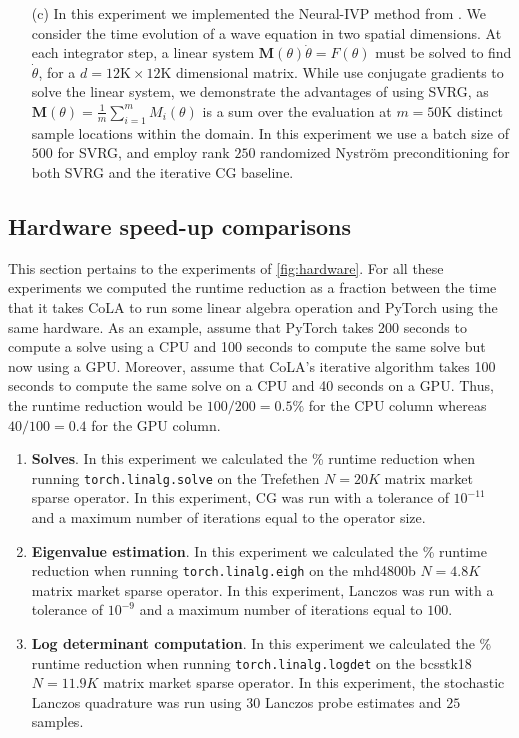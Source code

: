 \documentclass{article}
\newcommand{\mbf}[1]{{\boldsymbol{\mathbf{#1}}}}
\renewcommand{\bm}{\mbf}
\begin{document}
\begin{enumerate}
    \item[(c)]
    In this experiment we implemented the Neural-IVP method from \citet{finzi2023nivp}.
    We consider the time evolution of a wave equation in two spatial dimensions.
    At each integrator step, a linear system $\bm M(\theta) \dot{\theta} = F(\theta)$ must be solved to find $\dot{\theta}$, for a $d=12\text{K}\times12$K dimensional matrix.
    While \citet{finzi2023nivp} use conjugate gradients to solve the linear system,
    we demonstrate the advantages of using SVRG,
    as $\bm M(\theta) = \tfrac{1}{m}\sum_{i=1}^m M_i(\theta)$ is a sum over the evaluation at $m=50$K distinct sample locations within the domain.
    In this experiment we use a batch size of $500$ for SVRG, and employ rank $250$ randomized Nystr\"{o}m preconditioning for both SVRG and the iterative CG baseline.
\end{enumerate}

\subsection{Hardware speed-up comparisons} \label{app:hardware}
This section pertains to the experiments of \autoref{fig:hardware}.
For all these experiments we computed the runtime reduction
as a fraction between the time that it takes CoLA
to run some linear algebra operation and PyTorch using the same hardware.
As an example, assume that PyTorch takes 200 seconds to compute a solve using a CPU and 100 seconds to compute the same solve but now using a GPU.
Moreover, assume that CoLA's iterative algorithm takes 100 seconds to compute the same solve on a CPU and 40 seconds on a GPU.
Thus, the runtime reduction would be $100 / 200 = 0.5\%$ for the CPU column whereas $40 / 100 = 0.4$ for the GPU column.

\begin{enumerate}
    \item
    \textbf{Solves}.
    In this experiment we calculated the \% runtime reduction when running
    \texttt{torch.linalg.solve} on the Trefethen $N=20K$ matrix market
    sparse operator. In this experiment, CG was run with a tolerance of
    $10^{-11}$ and a maximum number of iterations equal to the operator size.

    \item
    \textbf{Eigenvalue estimation}.
    In this experiment we calculated the \% runtime reduction when running
    \texttt{torch.linalg.eigh} on the mhd4800b $N=4.8K$ matrix market
    sparse operator. In this experiment, Lanczos was run with a tolerance of
    $10^{-9}$ and a maximum number of iterations equal to $100$.

    \item
    \textbf{Log determinant computation}.
    In this experiment we calculated the \% runtime reduction when running
    \texttt{torch.linalg.logdet} on the bcsstk18 $N=11.9K$ matrix market
    sparse operator. In this experiment, the stochastic Lanczos quadrature was run using $30$ Lanczos probe estimates and $25$ samples.

\end{enumerate}
\end{document}
